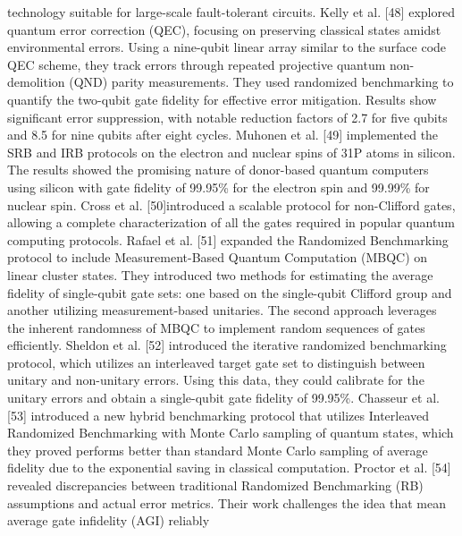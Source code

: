 technology suitable for large-scale fault-tolerant circuits. Kelly et al. [48] explored quantum error correction (QEC), focusing on preserving classical states amidst environmental errors. Using a nine-qubit linear array similar to the surface code QEC scheme, they track errors through repeated projective quantum non-demolition (QND) parity measurements. They used randomized benchmarking to quantify the two-qubit gate fidelity for effective error mitigation. Results show significant error suppression, with notable reduction factors of 2.7 for five qubits and 8.5 for nine qubits after eight cycles. Muhonen et al. [49] implemented the SRB and IRB protocols on the electron and nuclear spins of 31P atoms in silicon. The results showed the promising nature of donor-based quantum computers using silicon with gate fidelity of 99.95\% for the electron spin and 99.99\% for nuclear spin. Cross et al. [50]introduced a scalable protocol for non-Clifford gates, allowing a complete characterization of all the gates required in popular quantum computing protocols. Rafael et al. [51] expanded the Randomized Benchmarking protocol to include Measurement-Based Quantum Computation (MBQC) on linear cluster states. They introduced two methods for estimating the average fidelity of single-qubit gate sets: one based on the single-qubit Clifford group and another utilizing measurement-based unitaries. The second approach leverages the inherent randomness of MBQC to implement random sequences of gates efficiently. Sheldon et al. [52] introduced the iterative randomized benchmarking protocol, which utilizes an interleaved target gate set to distinguish between unitary and non-unitary errors. Using this data, they could calibrate for the unitary errors and obtain a single-qubit gate fidelity of 99.95\%. Chasseur et al. [53] introduced a new hybrid benchmarking protocol that utilizes Interleaved Randomized Benchmarking with Monte Carlo sampling of quantum states, which they proved performs better than standard Monte Carlo sampling of average fidelity due to the exponential saving in classical computation. Proctor et al. [54] revealed discrepancies between traditional Randomized Benchmarking (RB) assumptions and actual error metrics. Their work challenges the idea that mean average gate infidelity (AGI) reliably 
